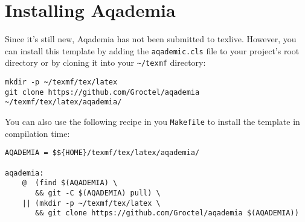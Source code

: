 \section{Installing Aqademia}

Since it's still new, Aqademia has not been submitted to texlive.
However, you can install this template by adding the \texttt{aqademic.cls} file to your project's root directory or by cloning it into your \texttt{\~{}/texmf} directory:

\begin{lstlisting}[language=Sh]
mkdir -p ~/texmf/tex/latex
git clone https://github.com/Groctel/aqademia ~/texmf/tex/latex/aqademia/
\end{lstlisting}

You can also use the following recipe in you \texttt{Makefile} to install the template in compilation time:

\begin{lstlisting}[language=Make]
AQADEMIA = $${HOME}/texmf/tex/latex/aqademia/

aqademia:
	@  (find $(AQADEMIA) \
	   && git -C $(AQADEMIA) pull) \
	|| (mkdir -p ~/texmf/tex/latex \
	   && git clone https://github.com/Groctel/aqademia $(AQADEMIA))
\end{lstlisting}
